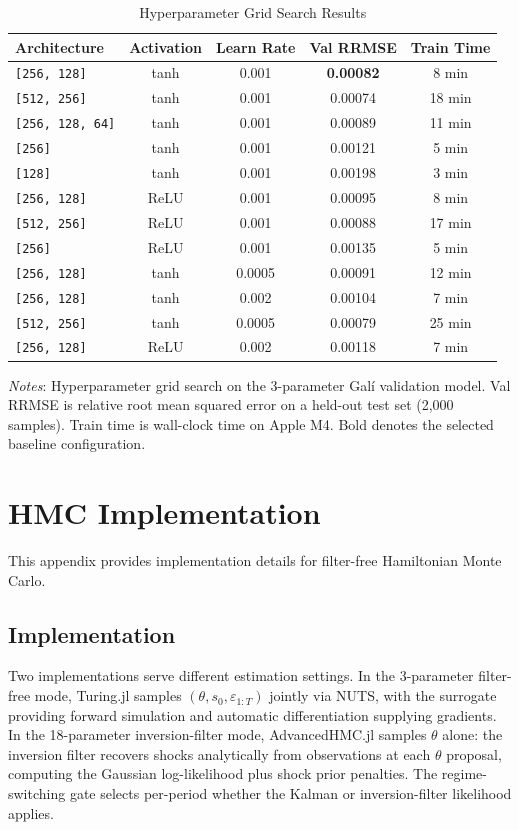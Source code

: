 \documentclass[12pt]{article}
\theoremstyle{plain}
\theoremstyle{definition}
\theoremstyle{remark}
\newcommand{\eps}{\varepsilon}
\begin{document}
\begin{table}[htbp]
\centering
\caption{Hyperparameter Grid Search Results}
\label{tab:hyperparameter_grid}
\begin{tabular}{lcccc}
\toprule
Architecture & Activation & Learn Rate & Val RRMSE & Train Time \\
\midrule
\texttt{[256, 128]} & tanh & 0.001 & \textbf{0.00082} & 8 min \\
\texttt{[512, 256]} & tanh & 0.001 & 0.00074 & 18 min \\
\texttt{[256, 128, 64]} & tanh & 0.001 & 0.00089 & 11 min \\
\texttt{[256]} & tanh & 0.001 & 0.00121 & 5 min \\
\texttt{[128]} & tanh & 0.001 & 0.00198 & 3 min \\
\texttt{[256, 128]} & ReLU & 0.001 & 0.00095 & 8 min \\
\texttt{[512, 256]} & ReLU & 0.001 & 0.00088 & 17 min \\
\texttt{[256]} & ReLU & 0.001 & 0.00135 & 5 min \\
\texttt{[256, 128]} & tanh & 0.0005 & 0.00091 & 12 min \\
\texttt{[256, 128]} & tanh & 0.002 & 0.00104 & 7 min \\
\texttt{[512, 256]} & tanh & 0.0005 & 0.00079 & 25 min \\
\texttt{[256, 128]} & ReLU & 0.002 & 0.00118 & 7 min \\
\bottomrule
\end{tabular}
\smallskip
{\footnotesize \textit{Notes}: Hyperparameter grid search on the 3-parameter Gal\'{i} validation model. Val RRMSE is relative root mean squared error on a held-out test set (2,000 samples). Train time is wall-clock time on Apple M4. Bold denotes the selected baseline configuration.}
\end{table}


\section{HMC Implementation}
\label{app:hmc}

This appendix provides implementation details for filter-free Hamiltonian Monte Carlo.


\subsection{Implementation}

Two implementations serve different estimation settings. In the 3-parameter filter-free mode, Turing.jl samples $(\theta, s_0, \eps_{1:T})$ jointly via NUTS, with the surrogate providing forward simulation and automatic differentiation supplying gradients. In the 18-parameter inversion-filter mode, AdvancedHMC.jl samples $\theta$ alone: the inversion filter recovers shocks analytically from observations at each $\theta$ proposal, computing the Gaussian log-likelihood plus shock prior penalties. The regime-switching gate selects per-period whether the Kalman or inversion-filter likelihood applies.
\end{document}
